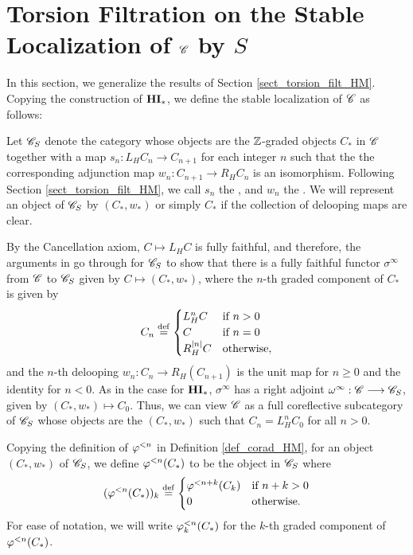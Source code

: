 \section{Torsion Filtration on the Stable Localization of 
$\mathscr{C}$ by $S$}

In this section, we generalize the results of Section 
\ref{sect_torsion_filt_HM}. Copying the construction of $\mathbf{HI}_*$, we
define the stable localization of $\mathscr{C}$ as follows:

\begin{defn}\label{def_C_loc_S}
  Let $\mathscr{C}_{S}$ denote the category whose objects are the
  $\mathbb{Z}$-graded objects $C_*$ in $\mathscr{C}$ together with a map $s_n:
  L_HC_n \to C_{n + 1}$ for each integer $n$ such that the
  the corresponding adjunction map $w_n: C_{n + 1} \to R_HC_n$ is an
  isomorphism. Following Section \ref{sect_torsion_filt_HM}, we call
  $s_n$ the , and $w_n$ the . We will represent an object of $\mathscr{C}_{S}$ by
  $(C_*, w_*)$ or simply $C_*$ if the collection of delooping maps are
  clear.
\end{defn}

By the Cancellation axiom, $C \mapsto L_HC$ is fully faithful,
and therefore, the arguments in \cite[1.8]{DegModHom} go through
for $\mathscr{C}_{S}$ to show that there is a fully faithful 
functor $\sigma^\infty$ from $\mathscr{C}$ to $\mathscr{C}_{S}$ given by
$C \mapsto (C_*, w_*)$, where the $n$-th graded component of $C_*$
is given by
\[
C_n \stackrel{\mathrm{def}}{=} \begin{cases}
L_H^nC &\textrm{if }n > 0\\
C      &\textrm{if }n = 0\\
R_H^{|n|} C &\textrm{otherwise},
\end{cases}
\]
and the $n$-th delooping $w_n: C_n \to R_H(C_{n + 1})$ is the unit
map for $n \geq 0$ and the identity for $n < 0$. As in the case for
$\mathbf{HI}_*$, $\sigma^\infty$ has a right adjoint $\omega^\infty: \mathscr{C}
\longrightarrow \mathscr{C}_{S}$, given by $(C_*, w_*) \mapsto C_0$. Thus, we
can view $\mathscr{C}$ as a full coreflective subcategory of 
$\mathscr{C}_{S}$ whose objects are the $(C_*, w_*)$ such that 
$C_n = L_H^nC_0$ for all $n > 0$. 

\begin{defn}\label{def_corad_loc_gen}
Copying the definition of $\varphi^{< n}$ in Definition 
\ref{def_corad_HM}, for an object $(C_*, w_*)$ of $\mathscr{C}_{S}$,
we define $\varphi^{< n}(C_*)$ to be the object in 
$\mathscr{C}_{S}$ where
\[
(\varphi^{< n}(C_*))_k \stackrel{\mathrm{def}}{=}
\begin{cases}
\varphi^{< n + k}(C_k) &\textrm{if }n + k > 0\\
0  &\textrm{otherwise}.
\end{cases}
\]
For ease of notation, we will write $\varphi^{< n}_k(C_*)$ for the 
$k$-th graded component of $\varphi^{< n}(C_*)$.
\end{defn}

